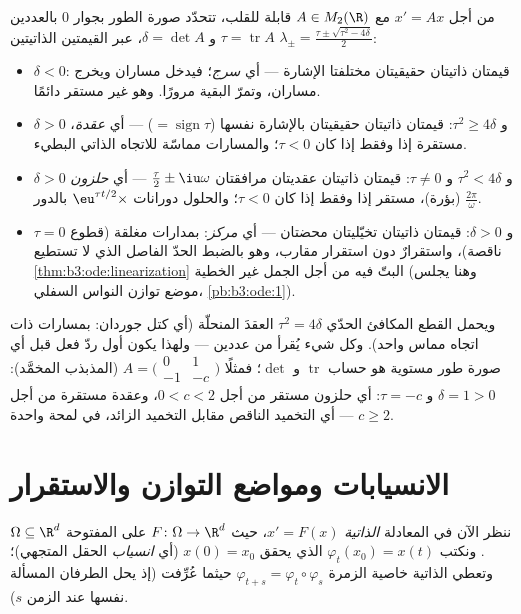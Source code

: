 \begin{example}
\label{ex:b3:ode:planeclassification}
من أجل $x' = Ax$ مع $A \in M_2(\R)$ قابلة للقلب، تتحدّد صورة
الطور بجوار $0$ بالعددين $\tau = \operatorname{tr}A$ و $\delta = \det A$، عبر القيمتين
الذاتيتين $\lambda_\pm
= \frac{\tau \pm \sqrt{\tau^2 - 4\delta}}2$:
\begin{itemize}
  \item $\delta < 0$: قيمتان ذاتيتان حقيقيتان مختلفتا الإشارة
        --- أي \emph{سرج}؛ فيدخل مساران ويخرج مساران، وتمرّ
        البقية مرورًا. وهو غير مستقر دائمًا.
  \item $\delta > 0$ و $\tau^2 \geq 4\delta$: قيمتان ذاتيتان حقيقيتان
        بالإشارة نفسها ($= \operatorname{sign}\tau$) --- أي \emph{عقدة}، مستقرة
        إذا وفقط إذا كان $\tau < 0$؛ والمسارات مماسّة للاتجاه
        الذاتي البطيء.
  \item $\delta > 0$ و $\tau^2 < 4\delta$ و $\tau \neq 0$: قيمتان ذاتيتان
        عقديتان مرافقتان $\frac\tau2 \pm
        \iu\omega$ --- أي \emph{حلزون} (بؤرة)،
        مستقر إذا وفقط إذا كان $\tau < 0$؛ والحلول دورانات
        $\eu^{\tau t/2}\times$ بالدور $\frac{2\pi}\omega$.
  \item $\tau = 0$ و $\delta > 0$: قيمتان ذاتيتان تخيّليتان
        محضتان --- أي \emph{مركز}: بمدارات مغلقة (قطوع
        ناقصة)، واستقرارٌ دون استقرار مقارب، وهو بالضبط الحدّ
        الفاصل الذي لا تستطيع \cref{thm:b3:ode:linearization} البتّ فيه من أجل
        الجمل غير الخطية (وهنا يجلس موضع توازن النواس السفلي،
        \cref{pb:b3:ode:1}).
\end{itemize}
ويحمل القطع المكافئ الحدّي $\tau^2 = 4\delta$ العقدَ المنحلّة (أي كتل
جوردان: بمسارات ذات اتجاه مماس واحد). وكل شيء يُقرأ من عددين
--- ولهذا يكون أول ردّ فعل قبل أي صورة طور مستوية هو حساب
$\operatorname{tr}$ و $\det$؛ فمثلًا $A = \bigl(\begin{smallmatrix}0 & 1\\ -1 &
-c\end{smallmatrix}\bigr)$ (المذبذب المخمَّد): $\delta = 1 >
0$
و $\tau = -c$: أي حلزون مستقر من أجل $0 < c < 2$، وعقدة مستقرة
من أجل $c \geq 2$ --- أي التخميد الناقص مقابل التخميد الزائد،
في لمحة واحدة.
\end{example}

\section{الانسيابات ومواضع التوازن والاستقرار}

ننظر الآن في المعادلة \emph{الذاتية} $x' = F(x)$، حيث $F
\colon \Omega \to \R^d$
 على المفتوحة $\Omega
\subseteq \R^d$. ونكتب $\varphi_t(x_0) = x(t)$  الذي يحقق $x(0) = x_0$ (أي \emph{انسياب} الحقل
المتجهي)؛ وتعطي الذاتية خاصية الزمرة
$\varphi_{t+s} =
\varphi_t\circ\varphi_s$ حيثما عُرِّفت (إذ يحل الطرفان المسألة نفسها عند الزمن
$s$).

